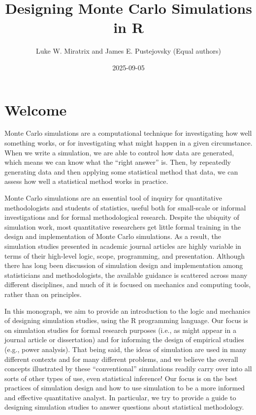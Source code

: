 \documentclass[
]{book}
\title{Designing Monte Carlo Simulations in R}
\author{Luke W. Miratrix and James E. Pustejovsky
(Equal authors)}
\date{2025-09-05}
\begin{document}
\maketitle

{
\setcounter{tocdepth}{1}
\tableofcontents
}
\chapter*{Welcome}\label{welcome}

Monte Carlo simulations are a computational technique for investigating how well something works, or for investigating what might happen in a given circumstance.
When we write a simulation, we are able to control how data are generated, which means we can know what the ``right answer'' is.
Then, by repeatedly generating data and then applying some statistical method that data, we can assess how well a statistical method works in practice.

Monte Carlo simulations are an essential tool of inquiry for quantitative methodologists and students of statistics, useful both for small-scale or informal investigations and for formal methodological research.
Despite the ubiquity of simulation work, most quantitative researchers get little formal training in the design and implementation of Monte Carlo simulations. As a result, the simulation studies presented in academic journal articles are highly variable in terms of their high-level logic, scope, programming, and presentation.
Although there has long been discussion of simulation design and implementation among statisticians and methodologists, the available guidance is scattered across many different disciplines, and much of it is focused on mechanics and computing tools, rather than on principles.

In this monograph, we aim to provide an introduction to the logic and mechanics of designing simulation studies, using the R programming language.
Our focus is on simulation studies for formal research purposes (i.e., as might appear in a journal article or dissertation) and for informing the design of empirical studies (e.g., power analysis).
That being said, the ideas of simulation are used in many different contexts and for many different problems, and we believe the overall concepts illustrated by these ``conventional'' simulations readily carry over into all sorts of other types of use, even statistical inference!
Our focus is on the best practices of simulation design and how to use simulation to be a more informed and effective quantitative analyst.
In particular, we try to provide a guide to designing simulation studies to answer questions about statistical methodology.
\end{document}
